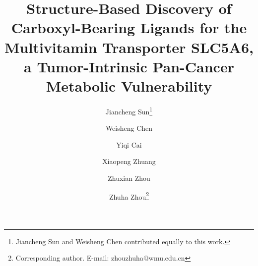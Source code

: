 \documentclass[10pt,letterpaper]{article}
\begin{document}
\title{Structure-Based Discovery of Carboxyl-Bearing Ligands for the Multivitamin Transporter SLC5A6, a Tumor-Intrinsic Pan-Cancer Metabolic Vulnerability}

\author[1]{Jiancheng Sun\thanks{Jiancheng Sun and Weisheng Chen contributed equally to this work.}}
\author[1]{Weisheng Chen}
\author[1]{Yiqi Cai}
\author[1]{Xiaopeng Zhuang}
\author[2]{Zhuxian Zhou}
\author[1]{Zhuha Zhou\thanks{Corresponding author. E-mail: zhouzhuha@wmu.edu.cn}}


\date{}

\maketitle
\end{document}
